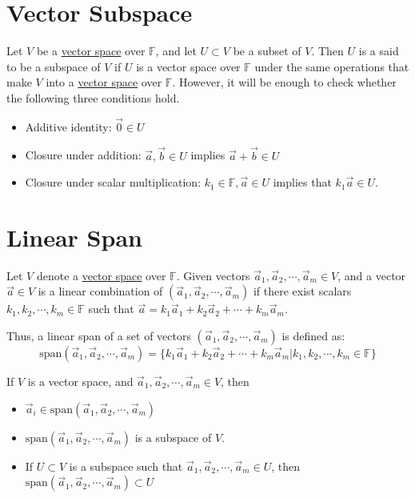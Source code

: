 \documentclass[conference,final,11pt,technote,onecolumn]{IEEEtran}\usepackage[]{graphicx}\usepackage[]{color}
\begin{document}
	\section{Vector Subspace}
	\label{term_vector_subspace}
Let $V$ be a \hyperref[term:vector_space]{vector space}	over $\mathbb{F}$, and let $U\subset V$ be a subset of $V$. Then $U$ is a said to be a subspace of $V$ if $U$ is a vector space over $\mathbb{F}$ under the same operations that make $V$ into a \hyperref[term:vector_space]{vector space} over $\mathbb{F}$. However, it will be enough to check whether the following three conditions hold.
\begin{itemize}
\item Additive identity: $\vec 0 \in U$
\item Closure under addition: $\vec a, \vec b \in U$ implies $\vec a + \vec b \in U$
\item Closure under scalar multiplication: $k_1 \in \mathbb{F}, \vec a\in U$ implies that $k_1\vec a \in U$.
\end{itemize}
	
	\section{Linear Span}
	\label{term:linear_span}
Let $V$ denote a \hyperref[term:vector_space]{vector space} over $\mathbb{F}$. Given vectors $\vec a_1, \vec a_2, \cdots, \vec a_m \in V$, and a vector $\vec a\in V$ is a linear combination of $(\vec a_1, \vec a_2, \cdots, \vec a_m)$ if there exist scalars $k_1, k_2, \cdots, k_m\in \mathbb{F}$ such that $\vec a = k_1\vec a_1 + k_2\vec a_2+ \cdots + k_m\vec a_m$. 

Thus, a linear span of a set of vectors $(\vec a_1, \vec a_2, \cdots, \vec a_m)$ is defined as:
\[ 
\text{span}(\vec a_1, \vec a_2, \cdots, \vec a_m) = \{ k_1\vec a_1 + k_2\vec a_2 + \cdots + k_m\vec a_m | k_1, k_2, \cdots, k_m\in \mathbb{F}\}
\]

If $V$ is a vector space, and $\vec a_1, \vec a_2, \cdots, \vec a_m\in V$, then 
\begin{itemize}
\item $\vec a_i \in \text{span}(\vec a_1, \vec a_2, \cdots, \vec a_m)$
\item $\text{span}(\vec a_1, \vec a_2, \cdots, \vec a_m)$ is a subspace of $V$.
\item If $U\subset V$ is a subspace such that $\vec a_1, \vec a_2, \cdots, \vec a_m\in U$, then $\text{span}(\vec a_1, \vec a_2, \cdots, \vec a_m)\subset U$
\end{itemize}
	
\end{document}
